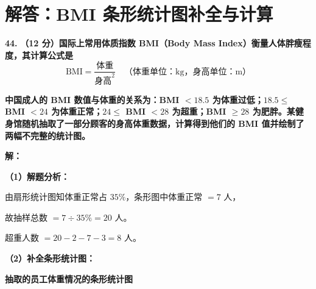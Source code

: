 \newpage



\newpage

\section{解答：BMI 条形统计图补全与计算}

\vspace{0.6cm}

\textbf{\LARGE 44.} \textbf{（12 分）国际上常用体质指数 BMI（Body Mass Index）衡量人体胖瘦程度，其计算公式是}
$$\text{BMI} = \frac{\text{体重}}{\text{身高}^2} \quad \text{（体重单位：kg，身高单位：m）}$$

\textbf{中国成人的 BMI 数值与体重的关系为：BMI $< 18.5$ 为体重过低；$18.5 \leqslant$ BMI $< 24$ 为体重正常；$24 \leqslant$ BMI $< 28$ 为超重；BMI $\geqslant 28$ 为肥胖。某健身馆随机抽取了一部分顾客的身高体重数据，计算得到他们的 BMI 值并绘制了两幅不完整的统计图。}

\vspace{0.4cm}
\textbf{解：}

\textbf{（1）解题分析：}

由扇形统计图知体重正常占 $35\%$，条形图中体重正常 $= 7$ 人，

故抽样总数 $= 7 \div 35\% = 20$ 人。

超重人数 $= 20 - 2 - 7 - 3 = 8$ 人。

\vspace{0.2cm}
\textbf{（2）补全条形统计图：}

\begin{center}
{\textbf{抽取的员工体重情况的条形统计图}}
\end{center}

